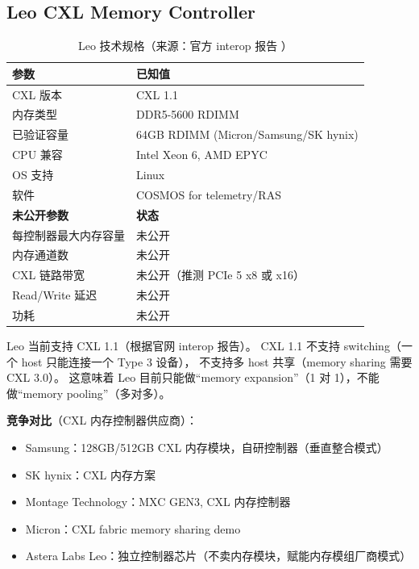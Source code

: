 \subsection{Leo CXL Memory Controller}

\begin{table}[htb]
    \centering
    \caption{Leo 技术规格（来源：官方 interop 报告 ）}
    \label{tab:leo-specs}
    \begin{tabular}{ll}
        \toprule
        \textbf{参数} & \textbf{已知值} \\
        \midrule
        CXL 版本 & CXL 1.1 \\
        内存类型 & DDR5-5600 RDIMM \\
        已验证容量 & 64GB RDIMM (Micron/Samsung/SK hynix) \\
        CPU 兼容 & Intel Xeon 6, AMD EPYC \\
        OS 支持 & Linux \\
        软件 & COSMOS for telemetry/RAS \\
        \midrule
        \textbf{未公开参数} & \textbf{状态} \\
        \midrule
        每控制器最大内存容量 & \unverified{} 未公开 \\
        内存通道数 & \unverified{} 未公开 \\
        CXL 链路带宽 & \unverified{} 未公开（推测 PCIe 5 x8 或 x16） \\
        Read/Write 延迟 & \unverified{} 未公开 \\
        功耗 & \unverified{} 未公开 \\
        \bottomrule
    \end{tabular}
\end{table}

Leo 当前支持 CXL 1.1（根据官网 interop 报告）。
CXL 1.1 不支持 switching（一个 host 只能连接一个 Type 3 设备），
不支持多 host 共享（memory sharing 需要 CXL 3.0）。
这意味着 Leo 目前只能做``memory expansion''（1 对 1），不能做``memory pooling''（多对多）。

\textbf{竞争对比}（CXL 内存控制器供应商）：
\begin{itemize}
    \item Samsung：128GB/512GB CXL 内存模块，自研控制器（垂直整合模式）
    \item SK hynix：CXL 内存方案
    \item Montage Technology：MXC GEN3, CXL 内存控制器
    \item Micron：CXL fabric memory sharing demo
    \item Astera Labs Leo：独立控制器芯片（不卖内存模块，赋能内存模组厂商模式）
\end{itemize}

